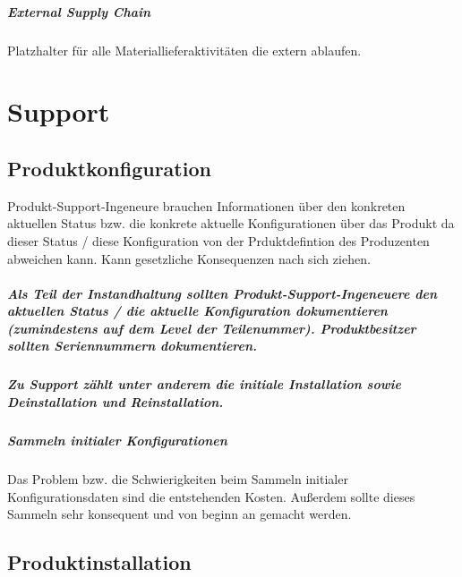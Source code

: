 \paragraph{External Supply Chain}
Platzhalter für alle Materiallieferaktivitäten die extern ablaufen.


\chapter{Support}

\section{Produktkonfiguration}
Produkt-Support-Ingeneure brauchen Informationen über den konkreten aktuellen Status bzw. die konkrete aktuelle Konfigurationen über das Produkt da dieser Status / diese Konfiguration von der Prduktdefintion des Produzenten abweichen kann. Kann gesetzliche Konsequenzen nach sich ziehen. 

\paragraph{Als Teil der Instandhaltung sollten Produkt-Support-Ingeneuere den aktuellen Status / die aktuelle Konfiguration dokumentieren (zumindestens auf dem Level der Teilenummer). Produktbesitzer sollten Seriennummern dokumentieren.}

\paragraph{Zu Support zählt unter anderem die initiale Installation sowie Deinstallation und Reinstallation.}


\paragraph{Sammeln initialer Konfigurationen}
Das Problem bzw. die Schwierigkeiten beim Sammeln initialer Konfigurationsdaten sind die entstehenden Kosten. Außerdem sollte dieses Sammeln sehr konsequent und von beginn an gemacht werden.

\section{Produktinstallation}


